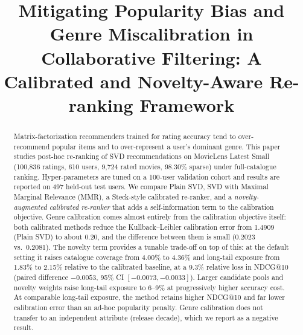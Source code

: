 \documentclass[conference]{IEEEtran}
\begin{document}
  \title{Mitigating Popularity Bias and Genre Miscalibration in Collaborative Filtering: A Calibrated and Novelty-Aware Re-ranking Framework}

  \author{
  \and
  }

  \maketitle

  \begin{abstract}
  Matrix-factorization recommenders trained for rating accuracy tend to over-recommend popular items and to over-represent a user's dominant genre. This paper studies post-hoc re-ranking of SVD recommendations on MovieLens Latest Small (100{,}836 ratings, 610 users, 9{,}724 rated movies, 98.30\% sparse) under full-catalogue ranking. Hyper-parameters are tuned on a 100-user validation cohort and results are reported on 497 held-out test users. We compare Plain SVD, SVD with Maximal Marginal Relevance (MMR), a Steck-style calibrated re-ranker, and a \emph{novelty-augmented calibrated re-ranker} that adds a self-information term to the calibration objective. Genre calibration comes almost entirely from the calibration objective itself: both calibrated methods reduce the Kullback--Leibler calibration error from 1.4909 (Plain SVD) to about 0.20, and the difference between them is small (0.2023 vs.\ 0.2081). The novelty term provides a tunable trade-off on top of this: at the default setting it raises catalogue coverage from 4.00\% to 4.36\% and long-tail exposure from 1.83\% to 2.15\% relative to the calibrated baseline, at a 9.3\% relative loss in NDCG@10 (paired difference $-0.0053$, 95\% CI $[-0.0073,-0.0033]$). Larger candidate pools and novelty weights raise long-tail exposure to 6--9\% at progressively higher accuracy cost. At comparable long-tail exposure, the method retains higher NDCG@10 and far lower calibration error than an ad-hoc popularity penalty. Genre calibration does not transfer to an independent attribute (release decade), which we report as a negative result.
  \end{abstract}
\end{document}
